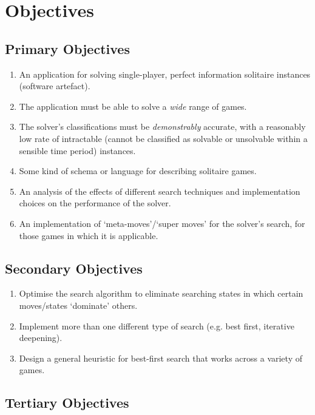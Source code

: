 \documentclass{article}
\begin{document}
\section{Objectives}

\subsection{Primary Objectives}

\begin{enumerate}
	\item An application for solving single-player, perfect information solitaire
		instances (software artefact).
  \item The application must be able to solve a \emph{wide} range of games.
  \item The solver's classifications must be \emph{demonstrably} accurate, with
		a reasonably low rate of intractable (cannot be classified as solvable or
		unsolvable within a sensible time period) instances.
  \item Some kind of schema or language for describing solitaire games.
	\item An analysis of the effects of different search techniques and
		implementation choices on the performance of the solver.
	\item An implementation of `meta-moves'/`super moves'\cite{SolLab} for the
		solver's search, for those games in which it is applicable.
\end{enumerate}

\subsection{Secondary Objectives}

\begin{enumerate}
	\item Optimise the search algorithm to eliminate searching states in which
		certain moves/states `dominate'\cite{WikDom} others.
	\item Implement more than one different type of search (e.g. best first,
		iterative deepening).
	\item Design a general heuristic for best-first search that works across a
		variety of games.
\end{enumerate}

\subsection{Tertiary Objectives}
\end{document}
